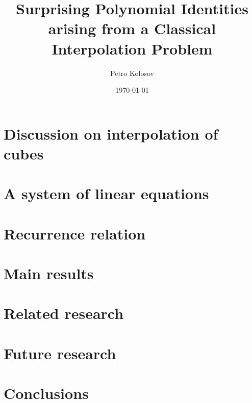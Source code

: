 \documentclass[12pt,letterpaper,oneside,reqno]{amsart}
\title[Surprising Polynomial Identities arising from a Class. Interpolation Problem]
{Surprising Polynomial Identities arising from a Classical Interpolation Problem}
\author[Petro Kolosov]{Petro Kolosov}
\date{\today}
\begin{document}
    \maketitle

    \begin{abstract}
        
    \end{abstract}

    \tableofcontents


    \section{Discussion on interpolation of cubes}
    \label{sec:the-problem-of-interpolation-of-cubes}
    


    \section{A system of linear equations}
    \label{sec:system-of-linear-equations-approach}
    


    \section{Recurrence relation}
    \label{sec:recurrence-relation-approach}
    


    \section{Main results}
    \label{sec:main-results}
    


    \section{Related research}\label{sec:related-research}
    


    \section{Future research}\label{sec:future-research}
    


    \section{Conclusions}\label{sec:conclusions}
    
\end{document}
